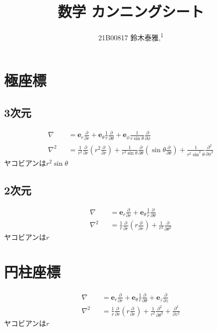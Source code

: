 \documentclass[12pt,dvipdfmx]{jsarticle}
\newcommand\authormark[1]{\textsuperscript{#1}}
\begin{document}
\title{数学 カンニングシート}

\author{21B00817 鈴木泰雅,\authormark{1}}
\section*{\Large{極座標}}
\subsection*{3次元}
\begin{eqnarray}
  \nabla &&= \bm{e}_r \frac{\partial}{\partial r} + \bm{e}_{\theta}\frac{1}{r} \frac{\partial}{\partial\theta} + \bm{e}_{\phi}\frac{1}{r\sin\theta}\frac{\partial}{\partial \phi}\\
  \nabla^2 &&= \frac{1}{r^2}\frac{\partial}{\partial r}\left( r^2\frac{\partial}{\partial r} \right) + \frac{1}{r^2\sin\theta}\frac{\partial}{\partial\theta}\left( \sin\theta\frac{\partial}{\partial\theta} \right) + \frac{1}{r^2\sin^2\theta}\frac{\partial^2}{\partial \phi^2}
\end{eqnarray}
ヤコビアンは$r^2\sin\theta$
\subsection*{2次元}
\begin{eqnarray}
  \nabla &&= \bm{e}_r \frac{\partial}{\partial r} + \bm{e}_{\theta}\frac{1}{r} \frac{\partial}{\partial\theta}\\
  \nabla^2 &&= \frac{1}{r}\frac{\partial}{\partial r}\left( r \frac{\partial}{\partial r} \right) + \frac{1}{r^2}\frac{\partial}{\partial\theta^2}
\end{eqnarray}
ヤコビアンは$r$
\section*{\Large{円柱座標}}
\begin{eqnarray}
  \nabla &&= \bm{e}_r \frac{\partial}{\partial r} + \bm{e}_{\theta}\frac{1}{r}\frac{\partial}{\partial \theta} +\bm{e}_z \frac{\partial}{\partial z}\\
  \nabla^2 &&= \frac{1}{r}\frac{\partial}{\partial r}\left( r\frac{\partial}{\partial r} \right) + \frac{1}{r^2}\frac{\partial^2}{\partial\theta^2} + \frac{\partial^2}{\partial z^2}
\end{eqnarray}
ヤコビアンは$r$
\end{document}
